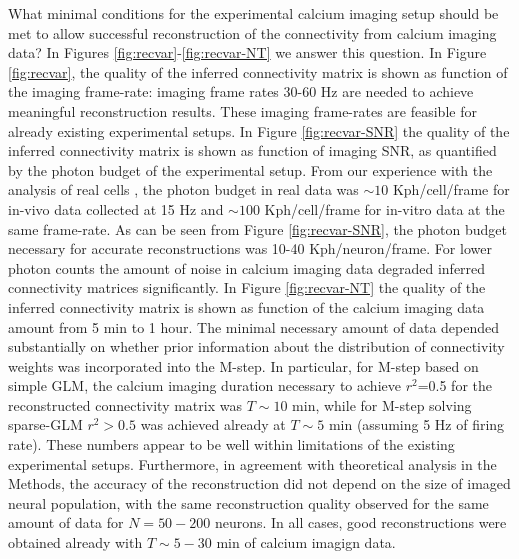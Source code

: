What minimal conditions for the experimental calcium imaging setup should be met to allow successful reconstruction of the connectivity from calcium imaging data? In Figures \ref{fig:recvar}-\ref{fig:recvar-NT} we answer this question. In Figure \ref{fig:recvar}, the quality of the inferred connectivity matrix is shown as function of the imaging frame-rate: imaging frame rates 30-60 Hz are needed to achieve meaningful reconstruction results. These imaging frame-rates are feasible for already existing experimental setups. In Figure \ref{fig:recvar-SNR} the quality of the inferred connectivity matrix is shown as function of imaging SNR, as quantified by the photon budget of the experimental setup. From our experience with the analysis of real cells \cite{Vogelstein2009}, the photon budget in real data was $\sim 10$ Kph/cell/frame for in-vivo data collected at 15  Hz and $\sim 100$ Kph/cell/frame for in-vitro data at the same frame-rate. As can be seen from Figure \ref{fig:recvar-SNR}, the photon budget necessary for accurate reconstructions was 10-40 Kph/neuron/frame. For lower photon counts the amount of noise in calcium imaging data degraded inferred connectivity matrices significantly.
In Figure \ref{fig:recvar-NT} the quality of the inferred connectivity matrix is shown as function of the calcium imaging data amount from 5 min to 1 hour. The minimal necessary amount of data depended substantially on whether prior information about the distribution of connectivity weights was incorporated into the M-step. In particular, for M-step based on simple GLM, the calcium imaging duration necessary to achieve $r^2$=0.5 for the reconstructed connectivity matrix was $T\sim 10$ min, while for M-step solving sparse-GLM $r^2>0.5$ was achieved already at $T\sim 5$ min (assuming 5 Hz of firing rate).
These numbers appear to be well within limitations of the existing experimental setups.
Furthermore, in agreement with theoretical analysis in the Methods, the accuracy of the reconstruction did not depend on the size of imaged neural population, with the same reconstruction quality observed for the same amount of data for $N=50-200$ neurons. In all cases, good reconstructions were obtained already with $T\sim 5-30$ min of calcium imagign data.


